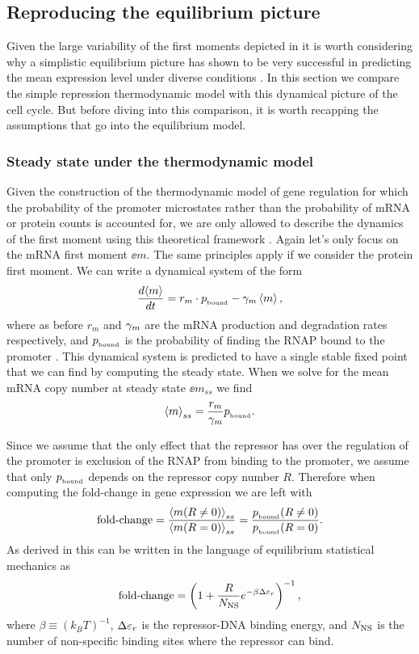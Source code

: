 \subsection{Reproducing the equilibrium picture}

Given the large variability of the first moments depicted in
 it is worth considering why a simplistic
equilibrium picture has shown to be very successful in predicting the mean
expression level under diverse conditions \cite{Garcia2011c, Brewster2014,
Barnes2019, Razo-Mejia2018}. In this section we compare the simple repression
thermodynamic model with this dynamical picture of the cell cycle. But before
diving into this comparison, it is worth recapping the assumptions that go into
the equilibrium model.

\subsubsection{Steady state under the thermodynamic model}

Given the construction of the thermodynamic model of gene regulation for which
the probability of the promoter microstates rather than the probability of mRNA
or protein counts is accounted for,  we are only allowed to describe the
dynamics of the first moment using this theoretical framework
\cite{Phillips2015}. Again let's only focus on the mRNA first moment $\ee{m}$.
The same principles apply if we consider the protein first moment. We can write
a dynamical system of the form
\begin{equation}
  {d{\left\langle m \right\rangle} \over dt} = r_m \cdot p_{_\text{bound}} - \gamma _m \left\langle m \right\rangle,
\end{equation}
where as before $r_m$ and $\gamma _m$ are the mRNA production and degradation rates
respectively, and $p_{_\text{bound}}$ is the probability of finding the RNAP bound to the
promoter \cite{Bintu2005a}. This dynamical system is predicted to have a single
stable fixed point that we can find by computing the steady state. When we solve
for the mean mRNA copy number at steady state $\ee{m}_{ss}$ we find
\begin{equation}
  \left\langle m \right\rangle_{ss} = {r_m \over \gamma _m} p_{_\text{bound}}.
\end{equation}

Since we assume that the only effect that the repressor has over the regulation
of the promoter is exclusion of the RNAP from binding to the promoter, we assume
that only $p_{_\text{bound}}$ depends on the repressor copy number $R$. Therefore when
computing the fold-change in gene expression we  are left with
\begin{equation}
  \text{fold-change} = {\left\langle m (R \neq 0) \right\rangle_{ss} \over \left\langle m (R = 0) \right\rangle_{ss}}
              = {p_{_\text{bound}} (R \neq 0) \over p_{_\text{bound}} (R = 0)}.
\end{equation}
As derived in \cite{Garcia2011c} this can be written in the language of
equilibrium statistical mechanics as
\begin{equation}
  \text{fold-change} = \left(1 + {R \over N_\text{NS}}e^{-\beta \Delta\varepsilon_r}  \right)^{-1},
  \label{seq_fold_change_thermo}
\end{equation}
where $\beta \equiv (k_BT)^{-1}$, $\Delta\varepsilon_r$ is the repressor-DNA binding energy, and
$N_\text{NS}$ is the number of non-specific binding sites where the repressor can bind.

